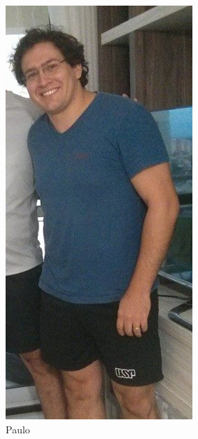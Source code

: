 \documentclass{beamer}
\begin{document}
\begin{frame}
\begin{center}
\begin{columns}[c]
\begin{figure}
\begin{center}
                \includegraphics[height=.5\textheight]{images/paulo.png}
                \caption{Paulo}
              \end{center}
            \end{figure}
           \begin{figure}
              \begin{center}

\end{center}
\end{figure}
\end{columns}
\end{center}
\end{frame}
\end{document}
